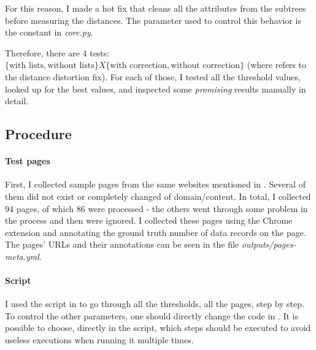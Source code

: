 \documentclass[10pt]{article}
\begin{document}
For this reason, I made a hot fix that cleans all the attributes from the subtrees before measuring the distances. The parameter used to control this behavior is the constant  in \emph{core.py}.

Therefore, there are 4 tests: $\{\text{with lists}, \text{without lists}\} X \{\text{with correction}, \text{without correction}\}$ (where  refers to the distance distortion fix). For each of those, I tested all the threshold values, looked up for the best values, and inspected some \emph{promising} results manually in detail.



\subsection{Procedure}

\paragraph{Test pages}


First, I collected sample pages from the same websites mentioned in \cite{mdr}\footnotemark. Several of them did not exist or completely changed of domain/content. In total, I collected $94$ pages, of which $86$ were processed - the others went through some problem in the process and then were ignored. I collected these pages using the Chrome extension and annotating the ground truth number of data records on the page. The pages' URLs and their annotations can be seen in the file \emph{outputs/pages-meta.yml}.


\paragraph{Script}

I used the script in  to go through all the thresholds, all the pages, step by step. To control the other parameters, one should directly change the code in . It is possible to choose, directly in the script, which steps should be executed to avoid useless executions when running it multiple times.
\end{document}
